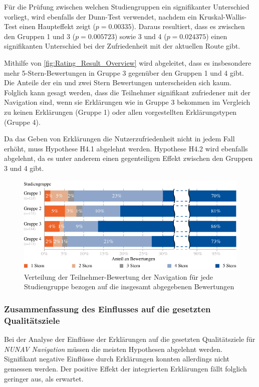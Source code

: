 Für die Prüfung zwischen welchen Studiengruppen ein signifikanter Unterschied vorliegt, wird ebenfalls der Dunn-Test \cite{dunn1964multiple} verwendet, nachdem ein Kruskal-Wallis-Test einen Haupteffekt zeigt ($ p = 0.00335 $). Daraus resultiert, dass es zwischen den Gruppen 1 und 3 ($ p = 0.005723$) sowie 3 und 4 ($ p = 0.024375 $) einen signifikanten Unterschied bei der Zufriedenheit mit der aktuellen Route gibt.

Mithilfe von \autoref{fig:Rating_Result_Overview} wird abgeleitet, dass es insbesondere mehr 5-Stern-Bewertungen in Gruppe 3 gegenüber den Gruppen 1 und 4 gibt. Die Anteile der ein und zwei Stern Bewertungen unterscheiden sich kaum. Folglich kann gesagt werden, dass die Teilnehmer signifikant zufriedener mit der Navigation sind, wenn sie Erklärungen wie in Gruppe 3 bekommen im Vergleich zu keinen Erklärungen (Gruppe 1) oder allen vorgestellten Erklärungstypen (Gruppe 4).

Da das Geben von Erklärungen die Nutzerzufriedenheit nicht in jedem Fall erhöht, muss Hypothese H4.1 abgelehnt werden. Hypothese H4.2 wird ebenfalls abgelehnt, da es unter anderem einen gegenteiligen Effekt zwischen den Gruppen 3 und 4 gibt.

\begin{figure}[t!]
    \centering
    \includegraphics[width=\textwidth]{contents/06_model_evaluation/02_evaluation/res/rating_result_overview.pdf}
    \caption{Verteilung der Teilnehmer-Bewertung der Navigation für jede Studiengruppe bezogen auf die insgesamt abgegebenen Bewertungen}
    \label{fig:Rating_Result_Overview}
\end{figure}

\subsubsection{Zusammenfassung des Einflusses auf die gesetzten Qualitätsziele}

Bei der Analyse der Einflüsse der Erklärungen auf die gesetzten Qualitätsziele für \textit{NUNAV Navigation} müssen die meisten Hypothesen abgelehnt werden. Signifikant negative Einflüsse durch Erklärungen konnten allerdings nicht gemessen werden. Der positive Effekt der integrierten Erklärungen fällt folglich geringer aus, als erwartet. 

